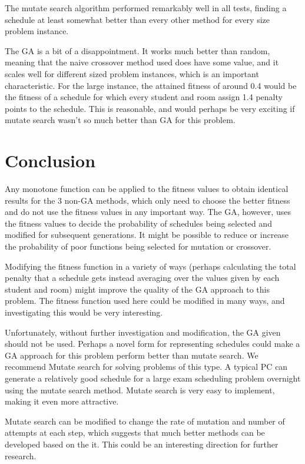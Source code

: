 \documentclass[letterpaper]{article}
\begin{document}
	The mutate search algorithm performed remarkably well in all tests, finding a 
	schedule at least somewhat better than every other method for every size problem 
	instance.
	
	The GA is a bit of a disappointment. It works much better than random, meaning 
	that the naive crossover method used does have some value, and it scales well 
	for different sized problem instances, which is an important characteristic. 
	For the large instance, the attained fitness of around 0.4 would be the fitness 
	of a schedule for which every student and room assign 1.4 penalty points to the 
	schedule. This is reasonable, and would perhaps be very exciting if mutate search 
	wasn't so much better than GA for this problem.
  
\section{Conclusion}
  Any monotone function can be applied to the fitness values to obtain identical 
  results for the 3 non-GA methods, which only need to choose the better fitness 
  and do not use the fitness values in any important way. The GA, however, uses 
  the fitness values to decide the probability of schedules being selected and 
  modified for subsequent generations. It might be possible to reduce or increase 
  the probability of poor functions being selected for mutation or crossover.
  
  Modifying the fitness function in a variety of ways (perhaps calculating the 
  total penalty that a schedule gets instead averaging over the values given by 
  each student and room) might improve the  quality of the GA approach to this 
  problem. The fitness function used here could  be modified in many ways, and 
  investigating this would be very interesting.

  Unfortunately, without further investigation and modification, the GA given 
  should not be used. Perhaps a novel form for representing schedules could make 
  a GA approach for this problem perform better than mutate search. We recommend 
  Mutate search for solving problems of this type. A typical PC can generate a 
  relatively good schedule for a large exam scheduling problem overnight using the
  mutate search method. Mutate search is very easy to implement, making it even 
  more attractive.

  Mutate search can be modified to change the rate of mutation and number of attempts 
  at each step, which suggests that much better methods can be developed based on the 
  it. This could be an interesting direction for further research.
  
\nocite{*}


\end{document}
